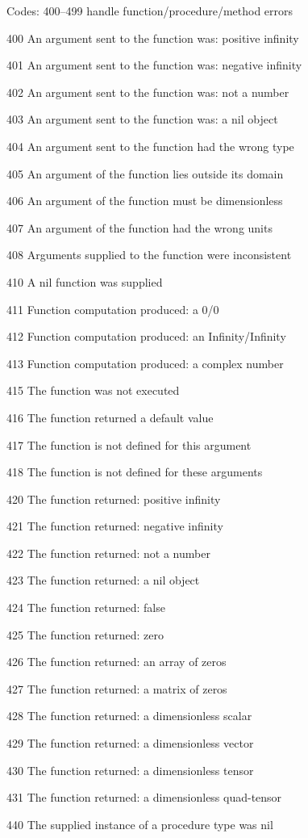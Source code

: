 \documentclass[twocolumn,twoside,fleqn,12pt]{article}
\newcommand{\namelistlabel}[1]{\mbox{#1}\hfil}
\newenvironment{namelist}[1]
   {\begin{list}{}%
      {\let\makelabel\namelistlabel%
       \settowidth{\labelwidth}{#1}%
       \setlength{\leftmargin}{1.1\labelwidth}%
       \setlength{\itemsep}{-6pt}%
      }%
   }{\end{list}%
}
\begin{document}
Codes: 400--499  handle function\slash procedure\slash method errors
\begin{namelist}{9999}
   \item[400] An argument sent to the function was: positive infinity
   \item[401] An argument sent to the function was: negative infinity
   \item[402] An argument sent to the function was: not a number
   \item[403] An argument sent to the function was: a nil object
   \item[404] An argument sent to the function had the wrong type
   \item[405] An argument of the function lies outside its domain
   \item[406] An argument of the function must be dimensionless
   \item[407] An argument of the function had the wrong units
   \item[408] Arguments supplied to the function were inconsistent
   \item[410] A nil function was supplied
   \item[411] Function computation produced: a 0/0
   \item[412] Function computation produced: an Infinity/Infinity
   \item[413] Function computation produced: a complex number
   \item[415] The function was not executed
   \item[416] The function returned a default value
   \item[417] The function is not defined for this argument
   \item[418] The function is not defined for these arguments
   \item[420] The function returned: positive infinity
   \item[421] The function returned: negative infinity
   \item[422] The function returned: not a number
   \item[423] The function returned: a nil object
   \item[424] The function returned: false
   \item[425] The function returned: zero
   \item[426] The function returned: an array of zeros
   \item[427] The function returned: a matrix of zeros
   \item[428] The function returned: a dimensionless scalar
   \item[429] The function returned: a dimensionless vector
   \item[430] The function returned: a dimensionless tensor
   \item[431] The function returned: a dimensionless quad-tensor
   \item[440] The supplied instance of a procedure type was nil
\end{namelist}
\end{document}
